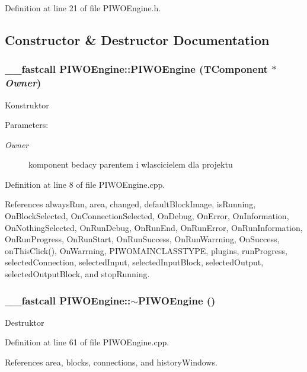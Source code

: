 Definition at line 21 of file PIWOEngine.h.

\subsection{Constructor \& Destructor Documentation}
\hypertarget{classPIWOEngine_cdfa1d8927a1dec652d405c4f6162f19}{
\subsubsection[PIWOEngine]{\setlength{\rightskip}{0pt plus 5cm}\_\-\_\-fastcall PIWOEngine::PIWOEngine (TComponent $\ast$ {\em Owner})}}
\label{classPIWOEngine_cdfa1d8927a1dec652d405c4f6162f19}


Konstruktor \begin{Desc}
\item[Parameters:]
\begin{description}
\item[{\em Owner}]komponent bedacy parentem i wlascicielem dla projektu \end{description}
\end{Desc}


Definition at line 8 of file PIWOEngine.cpp.

References alwaysRun, area, changed, defaultBlockImage, isRunning, OnBlockSelected, OnConnectionSelected, OnDebug, OnError, OnInformation, OnNothingSelected, OnRunDebug, OnRunEnd, OnRunError, OnRunInformation, OnRunProgress, OnRunStart, OnRunSuccess, OnRunWarrning, OnSuccess, onThisClick(), OnWarrning, PIWOMAINCLASSTYPE, plugins, runProgress, selectedConnection, selectedInput, selectedInputBlock, selectedOutput, selectedOutputBlock, and stopRunning.\hypertarget{classPIWOEngine_e7b0e23554e0bbac03efece62653e69f}{
\subsubsection[$\sim$PIWOEngine]{\setlength{\rightskip}{0pt plus 5cm}\_\-\_\-fastcall PIWOEngine::$\sim$PIWOEngine ()}}
\label{classPIWOEngine_e7b0e23554e0bbac03efece62653e69f}


Destruktor 

Definition at line 61 of file PIWOEngine.cpp.

References area, blocks, connections, and historyWindows.

